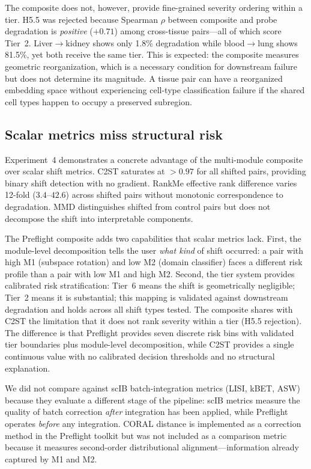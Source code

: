 \documentclass[11pt,letterpaper]{article}
\begin{document}
The composite does not, however, provide fine-grained severity ordering within a tier. H5.5 was rejected because Spearman $\rho$ between composite and probe degradation is \emph{positive} ($+0.71$) among cross-tissue pairs---all of which score Tier~2. Liver$\to$kidney shows only 1.8\% degradation while blood$\to$lung shows 81.5\%, yet both receive the same tier. This is expected: the composite measures geometric reorganization, which is a necessary condition for downstream failure but does not determine its magnitude. A tissue pair can have a reorganized embedding space without experiencing cell-type classification failure if the shared cell types happen to occupy a preserved subregion.

\subsection{Scalar metrics miss structural risk}

Experiment~4 demonstrates a concrete advantage of the multi-module composite over scalar shift metrics. C2ST saturates at $> 0.97$ for all shifted pairs, providing binary shift detection with no gradient. RankMe effective rank difference varies 12-fold ($3.4$--$42.6$) across shifted pairs without monotonic correspondence to degradation. MMD distinguishes shifted from control pairs but does not decompose the shift into interpretable components.

The Preflight composite adds two capabilities that scalar metrics lack. First, the module-level decomposition tells the user \emph{what kind} of shift occurred: a pair with high M1 (subspace rotation) and low M2 (domain classifier) faces a different risk profile than a pair with low M1 and high M2. Second, the tier system provides calibrated risk stratification: Tier~6 means the shift is geometrically negligible; Tier~2 means it is substantial; this mapping is validated against downstream degradation and holds across all shift types tested. The composite shares with C2ST the limitation that it does not rank severity within a tier (H5.5 rejection). The difference is that Preflight provides seven discrete risk bins with validated tier boundaries plus module-level decomposition, while C2ST provides a single continuous value with no calibrated decision thresholds and no structural explanation.

We did not compare against scIB batch-integration metrics (LISI, kBET, ASW) because they evaluate a different stage of the pipeline: scIB metrics measure the quality of batch correction \emph{after} integration has been applied, while Preflight operates \emph{before} any integration. CORAL distance \citep{sun2016coral} is implemented as a correction method in the Preflight toolkit but was not included as a comparison metric because it measures second-order distributional alignment---information already captured by M1 and M2.
\end{document}
